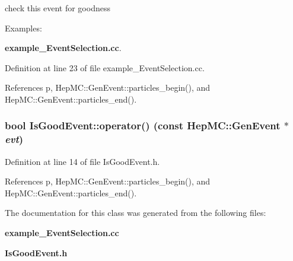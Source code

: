 check this event for goodness 

\begin{Desc}
\item[Examples: ]\par
{\bf example\_\-Event\-Selection.cc}.\end{Desc}


Definition at line 23 of file example\_\-Event\-Selection.cc.

References p, Hep\-MC::Gen\-Event::particles\_\-begin(), and Hep\-MC::Gen\-Event::particles\_\-end().
\subsubsection{\setlength{\rightskip}{0pt plus 5cm}bool Is\-Good\-Event::operator() (const {\bf Hep\-MC::Gen\-Event} $\ast$ {\em evt})\hspace{0.3cm}{\tt  [inline]}}\label{classIsGoodEvent_eb8864821e4db5babf9b002764a8b295}




Definition at line 14 of file Is\-Good\-Event.h.

References p, Hep\-MC::Gen\-Event::particles\_\-begin(), and Hep\-MC::Gen\-Event::particles\_\-end().

The documentation for this class was generated from the following files:\begin{CompactItemize}
\item 
{\bf example\_\-Event\-Selection.cc}\item 
{\bf Is\-Good\-Event.h}\end{CompactItemize}
